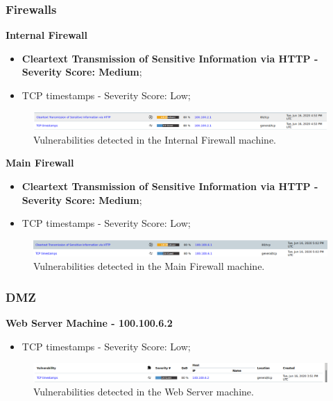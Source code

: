 \subsubsection{Firewalls}
\textbf{Internal Firewall}
\begin{itemize}
\item \textbf{Cleartext Transmission of Sensitive Information via HTTP - Severity Score: Medium};
\item TCP timestamps - Severity Score: Low;
\end{itemize}
\begin{figure}[!htb]
\centering
\begin{minipage}{.5\textwidth}
  \centering
  \includegraphics[width=1\textwidth]{internalFirewallVulns.png}
  \caption[a]{Vulnerabilities detected in the Internal Firewall machine.}\label{fig:6}
\end{minipage}%
\end{figure}

\textbf{Main Firewall}
\begin{itemize}
\item \textbf{Cleartext Transmission of Sensitive Information via HTTP - Severity Score: Medium};
\item TCP timestamps - Severity Score: Low;
\end{itemize}
\begin{figure}[!htb]
\centering
\begin{minipage}{.5\textwidth}
  \centering
  \includegraphics[width=1\textwidth]{mainFirewallVulns.png}
  \caption[a]{Vulnerabilities detected in the Main Firewall machine.}\label{fig:7}
\end{minipage}%
\end{figure}

\subsubsection{DMZ}
\textbf{Web Server Machine - 100.100.6.2}
\begin{itemize}
\item TCP timestamps - Severity Score: Low;
\end{itemize}
\begin{figure}[!htb]
\centering
\begin{minipage}{.5\textwidth}
  \centering
  \includegraphics[width=1\textwidth]{webServerVulns.png}
  \caption[a]{Vulnerabilities detected in the Web Server machine.}\label{fig:8}
\end{minipage}%
\end{figure}

